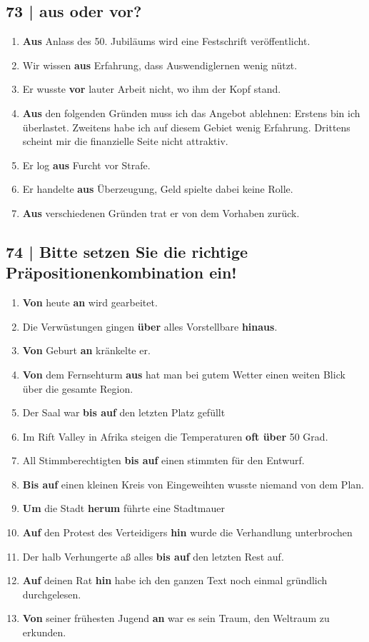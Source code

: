 \documentclass{article}
\begin{document}
	\subsection*{\textbf{73} | aus oder vor?}
	\begin{enumerate}
		\item{\textbf{Aus} Anlass des 50. Jubiläums wird eine Festschrift veröffentlicht.}
		\item{Wir wissen \textbf{aus} Erfahrung, dass Auswendiglernen wenig nützt.}
		\item{Er wusste \textbf{vor} lauter Arbeit nicht, wo ihm der Kopf stand.}
		\item{\textbf{Aus} den folgenden Gründen muss ich das Angebot ablehnen: Erstens bin ich überlastet. Zweitens habe ich auf diesem Gebiet wenig Erfahrung. Drittens scheint mir die finanzielle Seite nicht attraktiv.}
		\item{Er log \textbf{aus} Furcht vor Strafe.}
		\item{Er handelte \textbf{aus} Überzeugung, Geld spielte dabei keine Rolle.}
		\item{\textbf{Aus} verschiedenen Gründen trat er von dem Vorhaben zurück.}
	\end{enumerate}
	\subsection*{\textbf{74} | Bitte setzen Sie die richtige Präpositionenkombination ein!}
	\begin{enumerate}
		\item{\textbf{Von} heute \textbf{an} wird gearbeitet.}
		\item{Die Verwüstungen gingen \textbf{über} alles Vorstellbare \textbf{hinaus}.}
		\item{\textbf{Von} Geburt \textbf{an} kränkelte er.}
		\item{\textbf{Von} dem Fernsehturm \textbf{aus} hat man bei gutem Wetter einen weiten Blick über die gesamte Region.}
		\item{Der Saal war \textbf{bis auf} den letzten Platz gefüllt}
		\item{Im Rift Valley in Afrika steigen die Temperaturen \textbf{oft über} 50 Grad.}
		\item{All Stimmberechtigten \textbf{bis auf} einen stimmten für den Entwurf.}
		\item{\textbf{Bis auf} einen kleinen Kreis von Eingeweihten wusste niemand von dem Plan.}
		\item{\textbf{Um} die Stadt \textbf{herum} führte eine Stadtmauer}
		\item{\textbf{Auf} den Protest des Verteidigers \textbf{hin} wurde die Verhandlung unterbrochen}
		\item{Der halb Verhungerte aß alles \textbf{bis auf} den letzten Rest auf.}
		\item{\textbf{Auf} deinen Rat \textbf{hin} habe ich den ganzen Text noch einmal gründlich durchgelesen.}
		\item{\textbf{Von} seiner frühesten Jugend \textbf{an} war es sein Traum, den Weltraum zu erkunden.}
	\end{enumerate}
	
\end{document}
